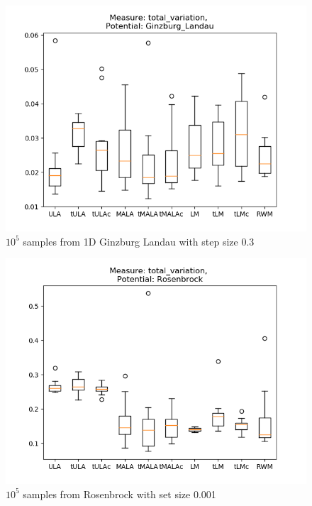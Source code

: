 \begin{figure}[ht!]
	\centering
		\includegraphics[height=0.43\textheight]{WriteUp/TV_ginzburg_step0pt01.png}
	\caption{$10^5$ samples from 1D Ginzburg Landau with step size 0.3}
	\label{fig:TVginz01}
\end{figure}

\begin{figure}[ht!]
	\centering
		\includegraphics[height=0.43\textheight]{WriteUp/TV_rosenbrock_step0pt001.png}
	\caption{$10^5$ samples from Rosenbrock with set size 0.001}
	\label{fig:TVrosen001}
\end{figure}


